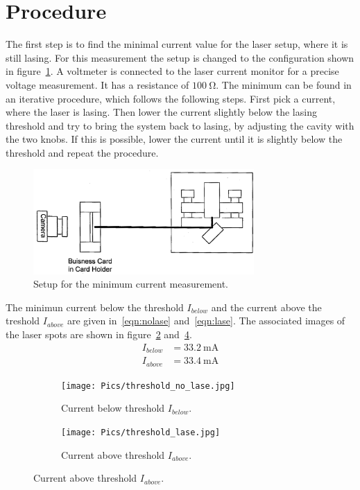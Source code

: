\vspace{-20pt}
\section{Procedure}
\label{sec:Procedure}

The first step is to find the minimal current value for the laser setup, where
it is still lasing. For this measurement the setup is changed to the configuration shown in
figure~\ref{fig:setup_current}. A voltmeter is connected to the laser current
monitor for a precise voltage measurement. It has a resistance
of $\SI{100}{\ohm}$.
The minimum can be found in an iterative procedure, which follows the following
steps. First pick a current, where the laser is lasing.
Then lower the current slightly below the lasing threshold and try to bring the system back to lasing,
by adjusting the cavity with the two knobs.
If this is possible, lower the current
until it is slightly below the threshold and repeat the procedure.

\begin{figure}
  \vspace{-10pt}
  \centering
  \includegraphics[width=0.75\textwidth]{Pics/setup_threshold.png}
  \caption{Setup for the minimum current measurement.\cite{anleitung}}
  \label{fig:setup_current}
\end{figure}

The minimun current below the threshold $I_{below}$ and the current above the treshold $I_{above}$
are given in~\eqref{eqn:nolase} and~\eqref{eqn:lase}.
The associated images of the laser spots are shown in figure~\ref{fig:no_lase}
and~\ref{fig:lase}.
\vspace{-10pt}
\begin{align}
  \label{eqn:nolase}
  I_{below} &= \SI{33.2}{\milli\ampere}\\
  \label{eqn:lase}
  I_{above} &= \SI{33.4}{\milli\ampere}
\end{align}

\begin{figure}[h!]
  \centering
  \begin{subfigure}{0.48\textwidth}
    \centering
    \texttt{[image: Pics/threshold\_no\_lase.jpg]}
    \caption{Current below threshold $I_{below}$.}
    \label{fig:no_lase}
  \end{subfigure}
  \begin{subfigure}{0.48\textwidth}
    \centering
    \texttt{[image: Pics/threshold\_lase.jpg]}
    \caption{Current above threshold $I_{above}$.}
    \label{fig:lase}
  \end{subfigure}
\end{figure}
\FloatBarrier

